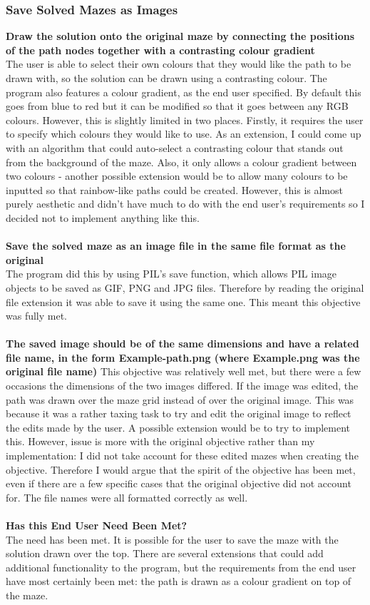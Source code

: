 \documentclass[titlepage]{article}
\begin{document}
\subsubsection{Save Solved Mazes as Images}
\textbf{Draw the solution onto the original maze by connecting the positions of the path nodes together with a contrasting colour gradient}\\
The user is able to select their own colours that they would like the path to be drawn with, so the solution can be drawn using a contrasting colour. The program also features a colour gradient, as the end user specified. By default this goes from blue to red but it can be modified so that it goes between any RGB colours. However, this is slightly limited in two places. Firstly, it requires the user to specify which colours they would like to use. As an extension, I could come up with an algorithm that could auto-select a contrasting colour that stands out from the background of the maze. Also, it only allows a colour gradient between two colours - another possible extension would be to allow many colours to be inputted so that rainbow-like paths could be created. However, this is almost purely aesthetic and didn't have much to do with the end user's requirements so I decided not to implement anything like this.\\\\
\textbf{Save the solved maze as an image file in the same file format as the original}\\
The program did this by using PIL's save function, which allows PIL image objects to be saved as GIF, PNG and JPG files. Therefore by reading the original file extension it was able to save it using the same one. This meant this objective was fully met.\\\\
\textbf{The saved image should be of the same dimensions and have a related file name, in the form Example-path.png (where Example.png was the original file name)}
This objective was relatively well met, but there were a few occasions the dimensions of the two images differed. If the image was edited, the path was drawn over the maze grid instead of over the original image. This was because it was a rather taxing task to try and edit the original image to reflect the edits made by the user. A possible extension would be to try to implement this. However, issue is more with the original objective rather than my implementation: I did not take account for these edited mazes when creating the objective. Therefore I would argue that the spirit of the objective has been met, even if there are a few specific cases that the original objective did not account for. The file names were all formatted correctly as well.\\\\
\textbf{Has this End User Need Been Met?}\\
The need has been met. It is possible for the user to save the maze with the solution drawn over the top. There are several extensions that could add additional functionality to the program, but the requirements from the end user have most certainly been met: the path is drawn as a colour gradient on top of the maze.
\end{document}
